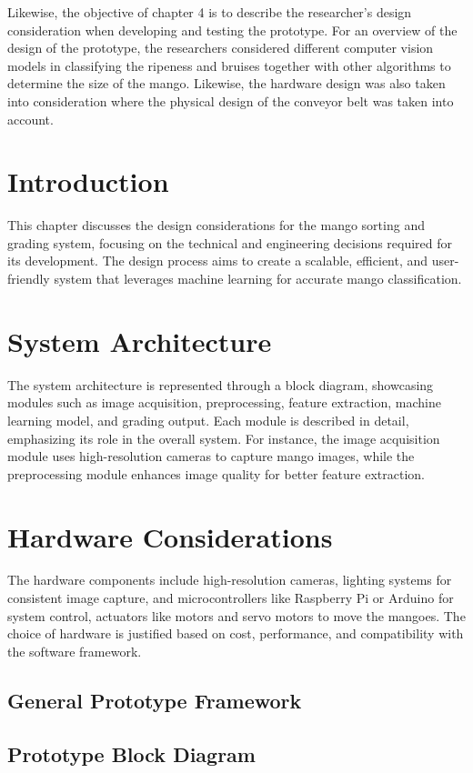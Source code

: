 
Likewise, the objective of chapter 4 is to describe the researcher's design consideration when developing and testing the prototype. For an overview of the design of the prototype, the researchers considered different computer vision models in classifying the ripeness and bruises together with other algorithms to determine the size of the mango. Likewise, the hardware design was also taken into consideration where the physical design of the conveyor belt was taken into account.

\section{Introduction}
This chapter discusses the design considerations for the mango sorting and grading system, focusing on the technical and engineering decisions required for its development. The design process aims to create a scalable, efficient, and user-friendly system that leverages machine learning for accurate mango classification.

\section{System Architecture}
The system architecture is represented through a block diagram, showcasing modules such as image acquisition, preprocessing, feature extraction, machine learning model, and grading output. Each module is described in detail, emphasizing its role in the overall system. For instance, the image acquisition module uses high-resolution cameras to capture mango images, while the preprocessing module enhances image quality for better feature extraction.

\section{Hardware Considerations}
The hardware components include high-resolution cameras, lighting systems for consistent image capture, and microcontrollers like Raspberry Pi or Arduino for system control, actuators like motors and servo motors to move the mangoes. The choice of hardware is justified based on cost, performance, and compatibility with the software framework.

\subsection{General Prototype Framework}

\subsection{Prototype Block Diagram}

